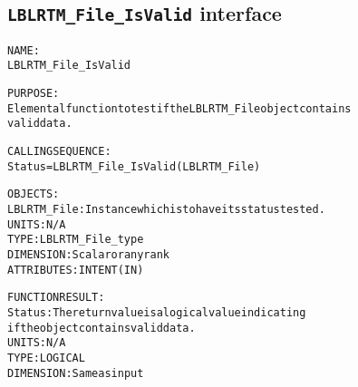 \subsection{\texttt{LBLRTM\_File\_IsValid} interface}
  \label{sec:LBLRTM_File_IsValid_interface}
  \begin{alltt}
 
  NAME:
        LBLRTM_File_IsValid
 
  PURPOSE:
        Elemental function to test if the LBLRTM_File object contains
        valid data.
 
  CALLING SEQUENCE:
        Status = LBLRTM_File_IsValid( LBLRTM_File )
 
  OBJECTS:
        LBLRTM_File:  Instance which is to have its status tested.
                       UNITS:      N/A
                       TYPE:       LBLRTM_File_type
                       DIMENSION:  Scalar or any rank
                       ATTRIBUTES: INTENT(IN)
 
  FUNCTION RESULT:
        Status:        The return value is a logical value indicating
                       if the object contains valid data.
                       UNITS:      N/A
                       TYPE:       LOGICAL
                       DIMENSION:  Same as input
 
  \end{alltt}
